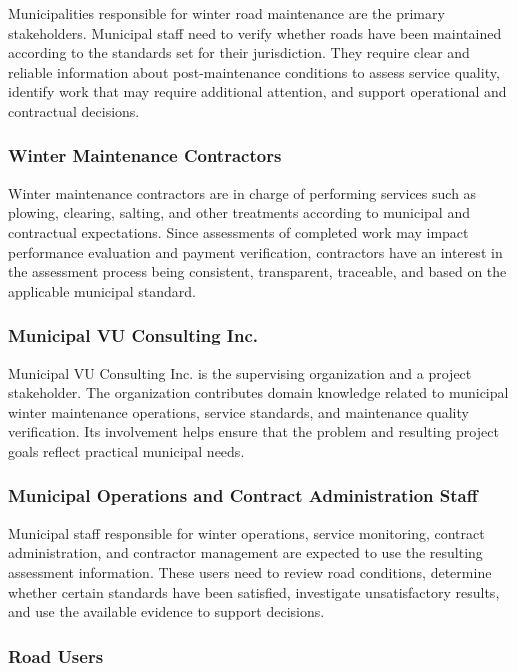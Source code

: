 \documentclass{article}
\begin{document}
Municipalities responsible for winter road maintenance are the primary
stakeholders. Municipal staff need to verify whether roads have been
maintained according to the standards set for their jurisdiction.
They require clear and reliable information about post-maintenance conditions
to assess service quality, identify work that may require additional
attention, and support operational and contractual decisions.

\subsubsection{Winter Maintenance Contractors}

Winter maintenance contractors are in charge of performing services such as
plowing, clearing, salting, and other treatments according to municipal and
contractual expectations. Since assessments of completed work may impact
performance evaluation and payment verification, contractors have an interest
in the assessment process being consistent, transparent, traceable, and based
on the applicable municipal standard.

\subsubsection{Municipal VU Consulting Inc.}

Municipal VU Consulting Inc. is the supervising organization and a project
stakeholder. The organization contributes domain knowledge related to
municipal winter maintenance operations, service standards, and maintenance
quality verification. Its involvement helps ensure that the problem and
resulting project goals reflect practical municipal needs.

\subsubsection{Municipal Operations and Contract Administration Staff}

Municipal staff responsible for winter operations, service monitoring, contract
administration, and contractor management are expected to use the resulting
assessment information. These users need to review road conditions, determine
whether certain standards have been satisfied, investigate unsatisfactory
results, and use the available evidence to support decisions.

\subsubsection{Road Users}
\end{document}
